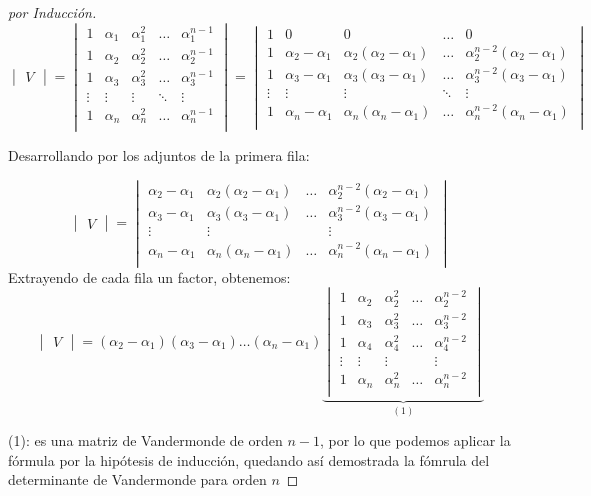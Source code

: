 \begin{proof}[por Inducción]
\[
\begin{vmatrix} V \end{vmatrix}=\begin{vmatrix}
1 & \alpha_1 & \alpha_1^2 & \dots & \alpha_1^{n-1}\\
1 & \alpha_2 & \alpha_2^2 & \dots & \alpha_2^{n-1}\\
1 & \alpha_3 & \alpha_3^2 & \dots & \alpha_3^{n-1}\\
\vdots & \vdots & \vdots & \ddots &\vdots \\
1 & \alpha_n & \alpha_n^2 & \dots & \alpha_n^{n-1}\\
\end{vmatrix}=\begin{vmatrix}
1 & 0 & 0 & \dots & 0\\
1 & \alpha_2-\alpha_1 & \alpha_2(\alpha_2-\alpha_1) & \dots & \alpha_2^{n-2}(\alpha_2-\alpha_1)\\
1 & \alpha_3-\alpha_1 & \alpha_3(\alpha_3-\alpha_1) & \dots & \alpha_3^{n-2}(\alpha_3-\alpha_1)\\
\vdots & \vdots & \vdots & \ddots &\vdots \\
1 & \alpha_n-\alpha_1 & \alpha_n(\alpha_n-\alpha_1) & \dots & \alpha_n^{n-2}(\alpha_n-\alpha_1)\\
\end{vmatrix}
\]

Desarrollando por los adjuntos de la primera fila: 

\[\begin{vmatrix} V \end{vmatrix}=\begin{vmatrix}
\alpha_2-\alpha_1 & \alpha_2(\alpha_2-\alpha_1) & \dots & \alpha_2^{n-2}(\alpha_2-\alpha_1)\\
\alpha_3-\alpha_1 & \alpha_3(\alpha_3-\alpha_1) & \dots & \alpha_3^{n-2}(\alpha_3-\alpha_1)\\
\vdots & \vdots & &\vdots \\
\alpha_n-\alpha_1 & \alpha_n(\alpha_n-\alpha_1) & \dots & \alpha_n^{n-2}(\alpha_n-\alpha_1)\\
\end{vmatrix}\]
Extrayendo de cada fila un factor, obtenemos:
\[\begin{vmatrix} V \end{vmatrix}=
(\alpha_2-\alpha_1)(\alpha_3-\alpha_1)\dots(\alpha_n-\alpha_1)
\underbrace{\begin{vmatrix}
1 & \alpha_2 & \alpha_2^2 & \dots & \alpha_2^{n-2}\\
1 & \alpha_3 & \alpha_3^2 & \dots & \alpha_3^{n-2}\\
1 & \alpha_4 & \alpha_4^2 & \dots & \alpha_4^{n-2}\\
\vdots & \vdots & \vdots & &\vdots \\
1 & \alpha_n & \alpha_n^2 & \dots & \alpha_n^{n-2}\\
\end{vmatrix}}_{(1)}\]

(1): es una matriz de Vandermonde de orden $n-1$, por lo que podemos aplicar la fórmula por la hipótesis de inducción, quedando así demostrada la fómrula del determinante de Vandermonde para orden $n$
\end{proof}


